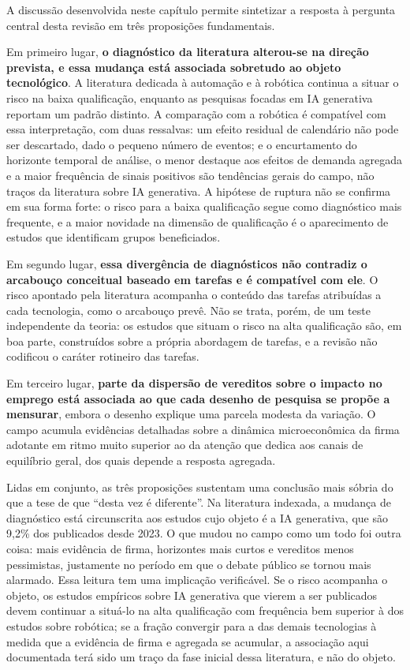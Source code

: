 A discussão desenvolvida neste capítulo permite sintetizar a resposta à pergunta central desta revisão em três proposições fundamentais. 

Em primeiro lugar, \textbf{o diagnóstico da literatura alterou-se na direção prevista, e essa mudança está associada sobretudo ao objeto tecnológico}. A literatura dedicada à automação e à robótica continua a situar o risco na baixa qualificação, enquanto as pesquisas focadas em IA generativa reportam um padrão distinto. A comparação com a robótica é compatível com essa interpretação, com duas ressalvas: um efeito residual de calendário não pode ser descartado, dado o pequeno número de eventos; e o encurtamento do horizonte temporal de análise, o menor destaque aos efeitos de demanda agregada e a maior frequência de sinais positivos são tendências gerais do campo, não traços da literatura sobre IA generativa. A hipótese de ruptura não se confirma em sua forma forte: o risco para a baixa qualificação segue como diagnóstico mais frequente, e a maior novidade na dimensão de qualificação é o aparecimento de estudos que identificam grupos beneficiados.

Em segundo lugar, \textbf{essa divergência de diagnósticos não contradiz o arcabouço conceitual baseado em tarefas e é compatível com ele}. O risco apontado pela literatura acompanha o conteúdo das tarefas atribuídas a cada tecnologia, como o arcabouço prevê. Não se trata, porém, de um teste independente da teoria: os estudos que situam o risco na alta qualificação são, em boa parte, construídos sobre a própria abordagem de tarefas, e a revisão não codificou o caráter rotineiro das tarefas.

Em terceiro lugar, \textbf{parte da dispersão de vereditos sobre o impacto no emprego está associada ao que cada desenho de pesquisa se propõe a mensurar}, embora o desenho explique uma parcela modesta da variação. O campo acumula evidências detalhadas sobre a dinâmica microeconômica da firma adotante em ritmo muito superior ao da atenção que dedica aos canais de equilíbrio geral, dos quais depende a resposta agregada.

Lidas em conjunto, as três proposições sustentam uma conclusão mais sóbria do que a tese de que ``desta vez é diferente''. Na literatura indexada, a mudança de diagnóstico está circunscrita aos estudos cujo objeto é a IA generativa, que são 9,2\% dos publicados desde 2023. O que mudou no campo como um todo foi outra coisa: mais evidência de firma, horizontes mais curtos e vereditos menos pessimistas, justamente no período em que o debate público se tornou mais alarmado. Essa leitura tem uma implicação verificável. Se o risco acompanha o objeto, os estudos empíricos sobre IA generativa que vierem a ser publicados devem continuar a situá-lo na alta qualificação com frequência bem superior à dos estudos sobre robótica; se a fração convergir para a das demais tecnologias à medida que a evidência de firma e agregada se acumular, a associação aqui documentada terá sido um traço da fase inicial dessa literatura, e não do objeto.
